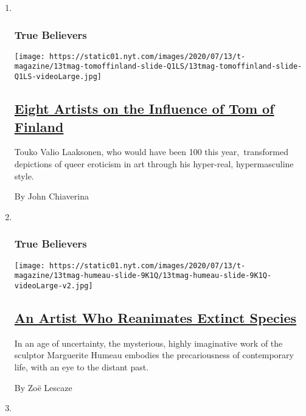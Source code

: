 \begin{enumerate}
\def\labelenumi{\arabic{enumi}.}
\item ~
  \hypertarget{true-believers-4}{%
  \subsubsection{True Believers}\label{true-believers-4}}

  \texttt{[image: https://static01.nyt.com/images/2020/07/13/t-magazine/13tmag-tomoffinland-slide-Q1LS/13tmag-tomoffinland-slide-Q1LS-videoLarge.jpg]}

  \hypertarget{eight-artists-on-the-influence-of-tom-of-finland}{%
  \subsection{\texorpdfstring{\href{/2020/07/23/t-magazine/tom-of-finland.html}{Eight
  Artists on the Influence of Tom of
  Finland}}{Eight Artists on the Influence of Tom of Finland}}\label{eight-artists-on-the-influence-of-tom-of-finland}}

  Touko Valio Laaksonen, who would have been 100 this year,~transformed
  depictions of queer eroticism in art through his hyper-real,
  hypermasculine style.

  By John Chiaverina
\item ~
  \hypertarget{true-believers-5}{%
  \subsubsection{True Believers}\label{true-believers-5}}

  \texttt{[image: https://static01.nyt.com/images/2020/07/13/t-magazine/13tmag-humeau-slide-9K1Q/13tmag-humeau-slide-9K1Q-videoLarge-v2.jpg]}

  \hypertarget{an-artist-who-reanimates-extinct-species}{%
  \subsection{\texorpdfstring{\href{/2020/07/23/t-magazine/marguerite-humeau.html}{An
  Artist Who Reanimates Extinct
  Species}}{An Artist Who Reanimates Extinct Species}}\label{an-artist-who-reanimates-extinct-species}}

  In an age of uncertainty, the mysterious, highly imaginative work of
  the sculptor Marguerite Humeau embodies the precariousness of
  contemporary life, with an eye to the distant past.

  By Zoë Lescaze
\item ~
  \hypertarget{true-believers-6}{%
}
\end{enumerate}
